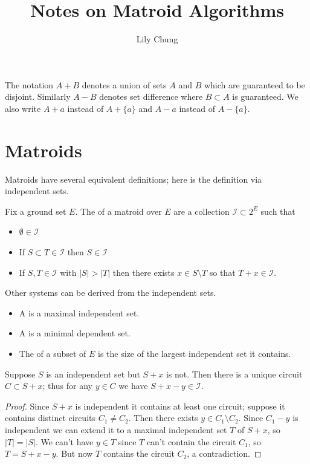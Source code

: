 \documentclass{article}
\title{Notes on Matroid Algorithms}
\author{Lily Chung}
\date{}
\newcommand*{\II}[0]{\mathcal{I}}
\begin{document}
\maketitle

The notation $A + B$ denotes a union of sets $A$ and $B$ which are guaranteed to be disjoint.  Similarly $A - B$ denotes set difference where $B \subset A$ is guaranteed.
We also write $A + a$ instead of $A + \{a\}$ and $A - a$ instead of $A - \{a\}$.

\section*{Matroids}

Matroids have several equivalent definitions; here is the definition via independent sets.

\begin{definition}
  Fix a ground set $E$.
  The  of a matroid over $E$ are a collection $\II \subset 2^E$ such that
  \begin{itemize}
  \item $\emptyset \in \II$
  \item If $S \subset T \in \II$ then $S \in \II$
  \item {} If $S, T \in \II$ with $|S| > |T|$ then there exists $x \in S \setminus T$ so that $T + x \in \II$.
  \end{itemize}
\end{definition}

Other systems can be derived from the independent sets.

\begin{itemize}
\item A  is a maximal independent set.
\item A  is a minimal dependent set.
\item The  of a subset of $E$ is the size of the largest independent set it contains.
\end{itemize}

\begin{lemma}
  Suppose $S$ is an independent set but $S + x$ is not.  Then there is a unique circuit $C \subset S + x$; thus for any $y \in C$ we have $S + x - y \in \II$.
\end{lemma}
\begin{proof}
  Since $S + x$ is independent it contains at least one circuit; suppose it contains distinct circuits $C_1 \ne C_2$.  Then there exists $y \in C_1 \setminus C_2$.  Since $C_1 - y$ is independent we can extend it to a maximal independent set $T$ of $S + x$, so $|T| = |S|$.  We can't have $y \in T$ since $T$ can't contain the circuit $C_1$, so $T = S + x - y$.  But now $T$ contains the circuit $C_2$, a contradiction.
\end{proof}
\end{document}

